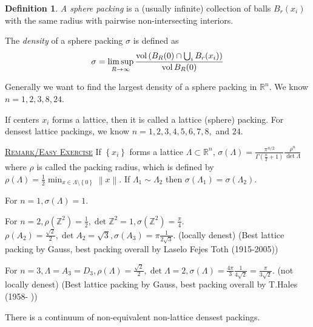 \documentclass{report}
\newcommand{\R}{\mathbb{R}}
\newcommand{\Z}{\mathbb{Z}}
\newcommand{\norm}[1]{\left\| #1 \right\|}
\newcommand{\set}[1]{\left\{ #1 \right\}}
\newcommand{\fancyem}[1]{\underline{\textsc{#1}}}
\theoremstyle{definition}
\newtheorem{definition}{Definition}[section]
\theoremstyle{remark}
\numberwithin{equation}{section}
\begin{document}
\begin{definition}
    \emph{A sphere packing} is a (usually infinite) collection of balls $B_r(x_i)$ with the same radius with pairwise non-intersecting interiors.
    
    The \emph{density} of a sphere packing $\sigma$ is defined as \[
        \sigma = \limsup_{R\to\infty} \frac{\operatorname{vol}\left(B_R(0) \cap \bigcup_i B_r(x_i)\right)}{\operatorname{vol} B_R(0)}\]
\end{definition}

Generally we want to find the largest density of a sphere packing in $\R^n$. We know $n=1, 2, 3, 8, 24$.

If centers $x_i$ forms a lattice, then it is called a lattice (sphere) packing. For densest lattice packings, we know $n = 1, 2, 3, 4, 5, 6, 7, 8, $ and $24$.

\fancyem{Remark/Easy Exercise} If $\set{x_i}$ forms a lattice $\Lambda \subset \R^n$, $\sigma(\Lambda) = \frac{\pi^{n/2}}{\Gamma\left(\frac{n}{2}+1\right)}\frac{\rho^n}{\det \Lambda}$ where $\rho$ is called the packing radius, which is defined by $\rho(\Lambda) = \frac{1}{2}\min_{x \in \Lambda \setminus \set{0}} \norm{x}$. If $\Lambda_1 \sim \Lambda_2$ then $\sigma(\Lambda_1) = \sigma(\Lambda_2)$.

For $n=1, \sigma(\Lambda) = 1$.

For $n=2, \rho(\Z^2) = \frac{1}{2}, \det \Z^2 = 1, \sigma(\Z^2) = \frac{\pi}{4}$.
$\rho(A_2) = \frac{\sqrt{2}}{2}, \det A_2 = \sqrt{3}, \sigma(A_3) = \pi \frac{1}{2\sqrt{3}}$. (locally denest) (Best lattice packing by Gauss, best packing overall by Laselo Fejes Toth (1915-2005))

For $n = 3, \Lambda = A_3 = D_3, \rho(\Lambda) = \frac{\sqrt{2}}{2}, \det \Lambda = 2, \sigma(\Lambda) = \frac{4\pi}{3}\frac{1}{4\sqrt{2}} = \frac{\pi}{3\sqrt{2}}$. (not locally denest) (Best lattice packing by Gauss, best packing overall by T.Hales (1958- ))

There is a continuum of non-equivalent non-lattice densest packings.
\end{document}
